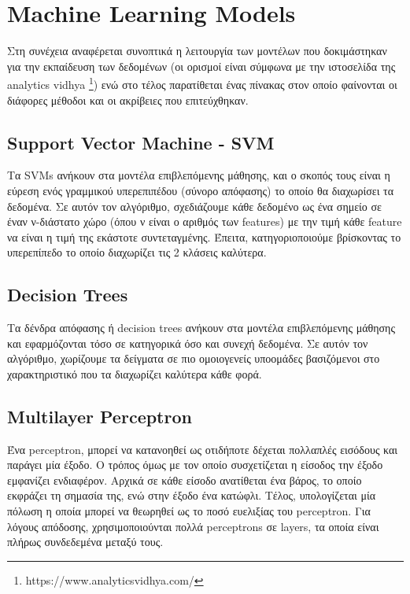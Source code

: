 \section{Machine Learning Models}

Στη συνέχεια αναφέρεται συνοπτικά η λειτουργία των μοντέλων που δοκιμάστηκαν για την εκπαίδευση των δεδομένων (οι ορισμοί είναι σύμφωνα με την ιστοσελίδα της analytics vidhya \footnote{https://www.analyticsvidhya.com/}) ενώ στο τέλος παρατίθεται ένας πίνακας στον οποίο φαίνονται οι διάφορες μέθοδοι και οι ακρίβειες που επιτεύχθηκαν.

\subsection{Support Vector Machine - SVM}

Τα SVMs ανήκουν στα μοντέλα επιβλεπόμενης μάθησης, και ο σκοπός τους είναι η εύρεση ενός γραμμικού υπερεπιπέδου (σύνορο απόφασης) το οποίο θα διαχωρίσει τα δεδομένα. Σε αυτόν τον αλγόριθμο, σχεδιάζουμε κάθε δεδομένο ως ένα σημείο σε έναν ν-διάστατο χώρο (όπου ν είναι ο αριθμός των features) με την τιμή κάθε feature να είναι η τιμή της εκάστοτε συντεταγμένης. Έπειτα, κατηγοριοποιούμε βρίσκοντας το υπερεπίπεδο το οποίο διαχωρίζει τις 2 κλάσεις καλύτερα.

\subsection{Decision Trees}

Τα δένδρα απόφασης ή decision trees ανήκουν στα μοντέλα επιβλεπόμενης μάθησης και εφαρμόζονται τόσο σε κατηγορικά όσο και συνεχή δεδομένα. Σε αυτόν τον αλγόριθμο, χωρίζουμε τα δείγματα σε πιο ομοιογενείς υποομάδες βασιζόμενοι στο χαρακτηριστικό που τα διαχωρίζει καλύτερα κάθε φορά.

\subsection{Multilayer Perceptron}

Ένα perceptron, μπορεί να κατανοηθεί ως οτιδήποτε δέχεται πολλαπλές εισόδους και παράγει μία έξοδο. Ο τρόπος όμως με τον οποίο συσχετίζεται η είσοδος την έξοδο εμφανίζει ενδιαφέρον. Αρχικά σε κάθε είσοδο ανατίθεται ένα βάρος, το οποίο εκφράζει τη σημασία της, ενώ στην έξοδο ένα κατώφλι. Τέλος, υπολογίζεται μία πόλωση η οποία μπορεί να θεωρηθεί ως το ποσό ευελιξίας του perceptron. Για λόγους απόδοσης, χρησιμοποιούνται πολλά perceptrons σε layers, τα οποία είναι πλήρως συνδεδεμένα μεταξύ τους.

